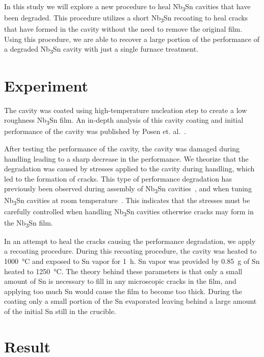 \documentclass{revtex4-2}
\begin{document}
In this study we will explore a new procedure to heal Nb\textsubscript{3}Sn cavities that have been degraded. This procedure utilizes a short Nb\textsubscript{3}Sn recoating to heal cracks that have formed in the cavity without the need to remove the original film. Using this procedure, we are able to recover a large portion of the performance of a degraded Nb\textsubscript{3}Sn cavity with just a single furnace treatment.


\section{Experiment}
\label{sec:Experiment}

The cavity was coated using high-temperature nucleation step to create a low roughness Nb\textsubscript{3}Sn film. An in-depth analysis of this cavity coating and initial performance of the cavity was published by Posen et. al.~\cite{posen2021advances}. 

After testing the performance of the cavity, the cavity was damaged during handling leading to a sharp decrease in the performance. We theorize that the degradation was caused by stresses applied to the cavity during handling, which led to the formation of cracks. This type of performance degradation has previously been observed during assembly of Nb\textsubscript{3}Sn cavities~\cite{eremeev2023preservation}, and when tuning Nb\textsubscript{3}Sn cavities at room temperature~\cite{eremeev:srf2019-mop015}. This indicates that the stresses must be carefully controlled when handling Nb\textsubscript{3}Sn cavities otherwise cracks may form in the Nb\textsubscript{3}Sn film.

In an attempt to heal the cracks causing the performance degradation, we apply a recoating procedure. During this recoating procedure, the cavity was heated to \qty{1000}{\degreeCelsius} and exposed to Sn vapor for \qty{1}{\hour}. Sn vapor was provided by \qty{0.85}{\gram} of Sn heated to \qty{1250}{\degreeCelsius}. The theory behind these parameters is that only a small amount of Sn is necessary to fill in any microscopic cracks in the film, and applying too much Sn would cause the film to become too thick. During the coating only a small portion of the Sn evaporated leaving behind a large amount of the initial Sn still in the crucible. 

\section{Result}
\label{sec:Results}
\end{document}
